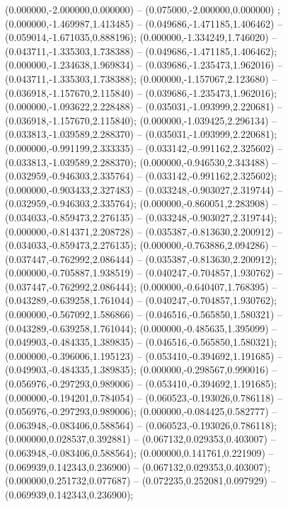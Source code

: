  (0.000000,-2.000000,0.000000) -- (0.075000,-2.000000,0.000000) ;
 (0.000000,-1.469987,1.413485) -- (0.049686,-1.471185,1.406462) -- (0.059014,-1.671035,0.888196);
 (0.000000,-1.334249,1.746020) -- (0.043711,-1.335303,1.738388) -- (0.049686,-1.471185,1.406462);
 (0.000000,-1.234638,1.969834) -- (0.039686,-1.235473,1.962016) -- (0.043711,-1.335303,1.738388);
 (0.000000,-1.157067,2.123680) -- (0.036918,-1.157670,2.115840) -- (0.039686,-1.235473,1.962016);
 (0.000000,-1.093622,2.228488) -- (0.035031,-1.093999,2.220681) -- (0.036918,-1.157670,2.115840);
 (0.000000,-1.039425,2.296134) -- (0.033813,-1.039589,2.288370) -- (0.035031,-1.093999,2.220681);
 (0.000000,-0.991199,2.333335) -- (0.033142,-0.991162,2.325602) -- (0.033813,-1.039589,2.288370);
 (0.000000,-0.946530,2.343488) -- (0.032959,-0.946303,2.335764) -- (0.033142,-0.991162,2.325602);
 (0.000000,-0.903433,2.327483) -- (0.033248,-0.903027,2.319744) -- (0.032959,-0.946303,2.335764);
 (0.000000,-0.860051,2.283908) -- (0.034033,-0.859473,2.276135) -- (0.033248,-0.903027,2.319744);
 (0.000000,-0.814371,2.208728) -- (0.035387,-0.813630,2.200912) -- (0.034033,-0.859473,2.276135);
 (0.000000,-0.763886,2.094286) -- (0.037447,-0.762992,2.086444) -- (0.035387,-0.813630,2.200912);
 (0.000000,-0.705887,1.938519) -- (0.040247,-0.704857,1.930762) -- (0.037447,-0.762992,2.086444);
 (0.000000,-0.640407,1.768395) -- (0.043289,-0.639258,1.761044) -- (0.040247,-0.704857,1.930762);
 (0.000000,-0.567092,1.586866) -- (0.046516,-0.565850,1.580321) -- (0.043289,-0.639258,1.761044);
 (0.000000,-0.485635,1.395099) -- (0.049903,-0.484335,1.389835) -- (0.046516,-0.565850,1.580321);
 (0.000000,-0.396006,1.195123) -- (0.053410,-0.394692,1.191685) -- (0.049903,-0.484335,1.389835);
 (0.000000,-0.298567,0.990016) -- (0.056976,-0.297293,0.989006) -- (0.053410,-0.394692,1.191685);
 (0.000000,-0.194201,0.784054) -- (0.060523,-0.193026,0.786118) -- (0.056976,-0.297293,0.989006);
 (0.000000,-0.084425,0.582777) -- (0.063948,-0.083406,0.588564) -- (0.060523,-0.193026,0.786118);
 (0.000000,0.028537,0.392881) -- (0.067132,0.029353,0.403007) -- (0.063948,-0.083406,0.588564);
 (0.000000,0.141761,0.221909) -- (0.069939,0.142343,0.236900) -- (0.067132,0.029353,0.403007);
 (0.000000,0.251732,0.077687) -- (0.072235,0.252081,0.097929) -- (0.069939,0.142343,0.236900);

